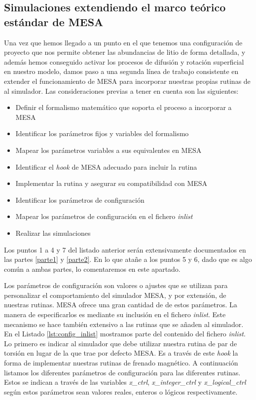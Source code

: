 \subsection{Simulaciones extendiendo el marco teórico estándar de MESA}
Una vez que hemos llegado a un punto en el que tenemos una configuración de proyecto que nos permite obtener las abundancias de litio de forma detallada, y además hemos conseguido activar los procesos de difusión y rotación superficial en nuestro modelo, damos paso a una segunda línea de trabajo consistente en extender el funcionamiento de MESA para incorporar nuestras propias rutinas de al simulador. Las consideraciones previas a tener en cuenta son las siguientes:

\begin{itemize}
	\item Definir el formalismo matemático que soporta el proceso a incorporar a MESA
	\item Identificar los parámetros fijos y variables del formalismo
	\item Mapear los parámetros variables a sus equivalentes en MESA
	\item Identificar el \textit{hook} de MESA adecuado para incluir la rutina
	\item Implementar la rutina y asegurar su compatibilidad con MESA
	\item Identificar los parámetros de configuración
	\item Mapear los parámetros de configuración en el fichero \textit{inlist}
	\item Realizar las simulaciones
\end{itemize}

Los puntos 1 a 4 y 7 del listado anterior serán extensivamente documentados en las partes \ref{parte1} y \ref{parte2}. En lo que atañe a los puntos 5 y 6, dado que es algo común a ambas partes, lo comentaremos en este apartado.\par

Los parámetros de configuración son valores o ajustes que se utilizan para personalizar el comportamiento del simulador MESA, y por extensión, de nuestras rutinas. MESA ofrece una gran cantidad de de estos parámetros. La manera de especificarlos es mediante su inclusión en el fichero \textit{inlist}. Este mecanismo se hace también extensivo a las rutinas que se añaden al simulador. En el Listado \ref{lst:config_inlist} mostramos parte del contenido del fichero \textit{inlist}. Lo primero es indicar al simulador que debe utilizar nuestra rutina de par de torsión en lugar de la que trae por defecto MESA. Es a través de este \textit{hook} la forma de implementar nuestras rutinas de frenado magnético. A continuación listamos los diferentes parámetros de configuración para las diferentes rutinas. Estos se indican a través de las variables \textit{x\_ctrl}, \textit{x\_integer\_ctrl} y \textit{x\_logical\_ctrl} según estos parámetros sean valores reales, enteros o lógicos respectivamente.\par 

